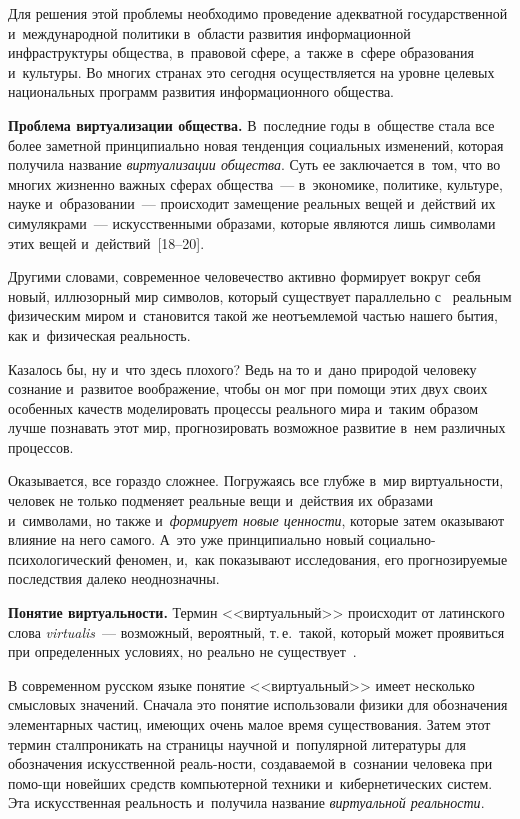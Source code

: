 \begin{multicols}{2}
{} 
     
     Для решения этой проблемы необходимо проведение адекватной 
государственной и~международной политики в~области развития 
информационной инфраструктуры общества, в~правовой сфере, а~также 
в~сфере образования и~культуры. Во многих странах это сегодня 
осуществляется на уровне целевых национальных программ развития 
информационного общества.
     
    \textbf{Проблема виртуализации общества.} В~последние годы 
    в~обществе стала все более заметной принципиально новая тенденция 
социальных изменений, которая получила название \textit{виртуализации 
общества}. Суть ее заключается в~том, что во многих жизненно важных 
сферах общества~--- в~экономике, политике, культуре, науке и~образовании~--- 
происходит замещение реальных вещей и~действий их симулякрами~--- 
искусственными образами, которые являются лишь символами этих вещей 
и~действий~[18--20].

    Другими словами, современное человечество активно формирует вокруг 
себя новый, иллюзорный мир символов, который существует параллельно с~
реальным физическим миром и~становится такой же неотъемлемой частью 
нашего бытия, как и~физическая реальность.
    
    Казалось бы, ну и~что здесь плохого? Ведь на то и~дано природой 
человеку сознание и~развитое воображение, чтобы он мог при помощи этих 
двух своих особенных качеств моделировать процессы реального мира 
и~таким образом лучше познавать этот мир, прогнозировать возможное 
развитие в~нем различных процессов. 
    
    Оказывается, все гораздо сложнее. Погружаясь все глубже в~мир 
виртуальности, человек не только подменяет реальные вещи и~действия их 
образами и~символами, но также и~\textit{формирует новые ценности}, 
которые затем оказывают влияние на него самого. А~это уже принципиально 
новый со\-ци\-аль\-но-пси\-хо\-ло\-ги\-че\-ский феномен, и,~как показывают 
исследования, его прогнозируемые последствия далеко неоднозначны.
    
    \textbf{Понятие виртуальности.} Термин <<виртуальный>> 
происходит от латинского слова \textit{virtualis}~--- возможный, вероятный, т.\,е.\ 
такой, который может проявиться при определенных условиях, но реально не 
существует~\cite{22-kol}.
     
     В современном русском языке понятие <<виртуальный>> имеет 
несколько смысловых значений. Сначала это понятие использовали физики 
для обозначения элементарных частиц, имеющих очень малое время 
существования. Затем этот термин стал\linebreak проникать на страницы научной 
и~популярной литературы для обозначения искусственной реаль-\linebreak ности, 
создаваемой в~сознании человека при помо-\linebreak щи новейших средств 
компьютерной техники и~киберне\-тических систем. Эта искусственная 
реальность и~получила название \textit{виртуальной реальности}.
{

}
\end{multicols}

